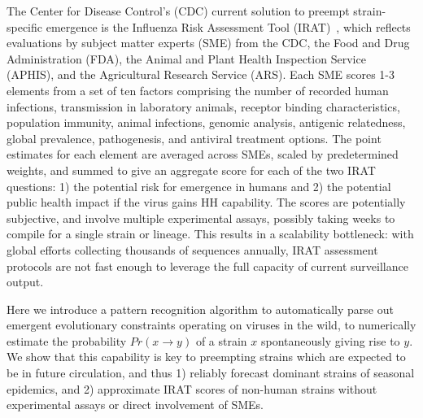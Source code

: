 \documentclass[onecolumn, compsoc,10pt]{IEEEtran}
\begin{document}
The Center for Disease Control's (CDC) current solution to preempt strain-specific emergence  is the Influenza Risk Assessment Tool (IRAT)~\cite{Influenz24:online},
which reflects evaluations%
by subject matter experts (SME) from the CDC, the Food and Drug Administration (FDA), the Animal and Plant Health Inspection Service (APHIS), and the Agricultural Research Service (ARS). Each SME scores 1-3 elements from a set of ten factors comprising the number of recorded human infections, transmission in laboratory animals, receptor binding characteristics, population immunity, animal infections, genomic analysis, antigenic relatedness, global prevalence,  pathogenesis, and antiviral treatment options. The point estimates for each  element are averaged across SMEs, scaled by predetermined weights, and summed to give an aggregate score for each of the two IRAT questions: 1) the potential risk for emergence in humans and 2) the potential public health impact if the virus gains HH capability. The scores  are potentially subjective, and  involve multiple experimental assays, possibly taking  weeks to compile for a single strain or lineage. This results in  a scalability bottleneck: with   global  efforts   collecting  thousands of sequences annually,  IRAT assessment protocols are  not fast enough to leverage the full capacity of current surveillance output.

Here we introduce a pattern recognition algorithm to automatically parse out emergent evolutionary constraints operating on \infl viruses in the wild, to numerically estimate the probability $Pr(x \rightarrow y)$ of a strain $x$ spontaneously giving rise to  $y$. We show that this capability is key to preempting  strains which are expected to be in future circulation, and thus 1) reliably forecast dominant strains of seasonal epidemics, and 2) approximate IRAT scores of non-human strains without  experimental assays or direct involvement of  SMEs.
\end{document}
